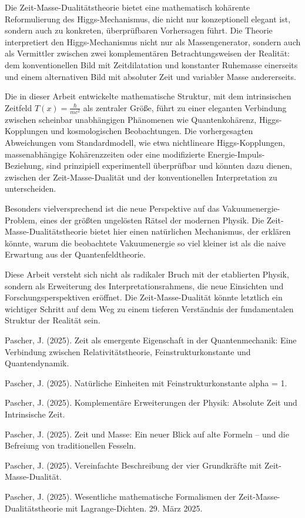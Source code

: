 \documentclass[a4paper,12pt]{article}
\newcommand{\Tfield}{T(x)} %
\begin{document}
	Die Zeit-Masse-Dualitätstheorie bietet eine mathematisch kohärente Reformulierung des Higgs-Mechanismus, die nicht nur konzeptionell elegant ist, sondern auch zu konkreten, überprüfbaren Vorhersagen führt. Die Theorie interpretiert den Higgs-Mechanismus nicht nur als Massengenerator, sondern auch als Vermittler zwischen zwei komplementären Betrachtungsweisen der Realität: dem konventionellen Bild mit Zeitdilatation und konstanter Ruhemasse einerseits und einem alternativen Bild mit absoluter Zeit und variabler Masse andererseits.
	
	Die in dieser Arbeit entwickelte mathematische Struktur, mit dem intrinsischen Zeitfeld $\Tfield = \frac{\hbar}{mc^2}$ als zentraler Größe, führt zu einer eleganten Verbindung zwischen scheinbar unabhängigen Phänomenen wie Quantenkohärenz, Higgs-Kopplungen und kosmologischen Beobachtungen. Die vorhergesagten Abweichungen vom Standardmodell, wie etwa nichtlineare Higgs-Kopplungen, massenabhängige Kohärenzzeiten oder eine modifizierte Energie-Impuls-Beziehung, sind prinzipiell experimentell überprüfbar und könnten dazu dienen, zwischen der Zeit-Masse-Dualität und der konventionellen Interpretation zu unterscheiden.
	
	Besonders vielversprechend ist die neue Perspektive auf das Vakuumenergie-Problem, eines der größten ungelösten Rätsel der modernen Physik. Die Zeit-Masse-Dualitätstheorie bietet hier einen natürlichen Mechanismus, der erklären könnte, warum die beobachtete Vakuumenergie so viel kleiner ist als die naive Erwartung aus der Quantenfeldtheorie.
	
	Diese Arbeit versteht sich nicht als radikaler Bruch mit der etablierten Physik, sondern als Erweiterung des Interpretationsrahmens, die neue Einsichten und Forschungsperspektiven eröffnet. Die Zeit-Masse-Dualität könnte letztlich ein wichtiger Schritt auf dem Weg zu einem tieferen Verständnis der fundamentalen Struktur der Realität sein.
	
	\begin{thebibliography}{9}
		
		 Pascher, J. (2025). Zeit als emergente Eigenschaft in der Quantenmechanik: Eine Verbindung zwischen Relativitätstheorie, Feinstrukturkonstante und Quantendynamik.
		
		 Pascher, J. (2025). Natürliche Einheiten mit Feinstrukturkonstante alpha = 1.
		
		 Pascher, J. (2025). Komplementäre Erweiterungen der Physik: Absolute Zeit und Intrinsische Zeit.
		
		 Pascher, J. (2025). Zeit und Masse: Ein neuer Blick auf alte Formeln – und die Befreiung von traditionellen Fesseln.
		
		 Pascher, J. (2025). Vereinfachte Beschreibung der vier Grundkräfte mit Zeit-Masse-Dualität.
		
		 Pascher, J. (2025). Wesentliche mathematische Formalismen der Zeit-Masse-Dualitätstheorie mit Lagrange-Dichten. 29. März 2025.
		
	\end{thebibliography}
	
\end{document}
